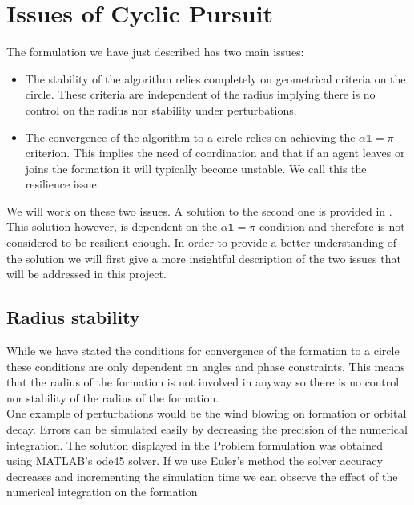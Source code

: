 \section{Issues of Cyclic Pursuit}

The formulation we have just described has two main issues:
\begin{itemize}
	\item The stability of the algorithm relies completely on geometrical criteria on the circle. These criteria are independent of the radius implying there is no control on the radius nor stability under perturbations.
	
	\item The convergence of the algorithm to a circle relies on achieving the $\alpha \mathbb{1} = \pi$ criterion. This implies the need of coordination and that if an agent leaves or joins the formation it will typically become unstable. We call this the resilience issue.
\end{itemize}

We will work on these two issues. A solution to the second one is provided in \cite{ramirez2010distributed}. This solution however, is dependent on the $\alpha \mathbb{1} = \pi$ condition and therefore is not considered to be resilient enough. In order to provide a better understanding of the solution we will first give a more insightful description of the two issues that will be addressed in this project.

\subsection{Radius stability}

While we have stated the conditions for convergence of the formation to a circle these conditions are only dependent on angles and phase constraints. This means that the radius of the formation is not involved in anyway so there is no control nor stability of the radius of the formation.
\\

One example of perturbations would be the wind blowing on formation or orbital decay. Errors can be simulated easily by decreasing the precision of the numerical integration. The solution displayed in the Problem formulation was obtained using MATLAB's ode45 solver. If we use Euler's method the solver accuracy decreases and incrementing the simulation time we can observe the effect of the numerical integration on the formation

